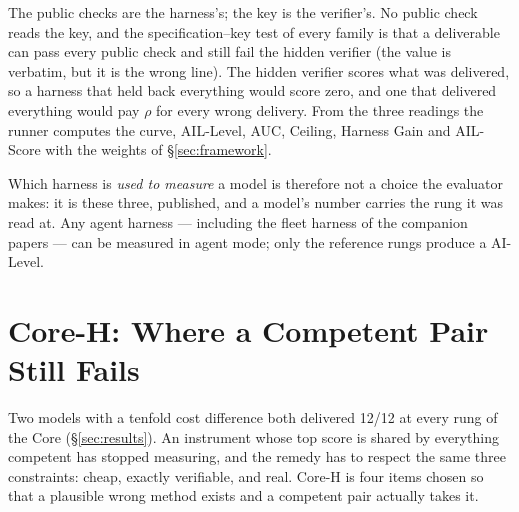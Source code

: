 \documentclass[11pt]{article}
\theoremstyle{definition}
\begin{document}
The public checks are the harness's; the key is the verifier's. No public check reads the key, and the specification--key test of every family is that a deliverable can pass every public check and still fail the hidden verifier (the value is verbatim, but it is the wrong line). The hidden verifier scores what was delivered, so a harness that held back everything would score zero, and one that delivered everything would pay $\rho$ for every wrong delivery. From the three readings the runner computes the curve, AIL-Level, AUC, Ceiling, Harness Gain and AIL-Score with the weights of \S\ref{sec:framework}.

Which harness is \emph{used to measure} a model is therefore not a choice the evaluator makes: it is these three, published, and a model's number carries the rung it was read at. Any agent harness --- including the fleet harness of the companion papers --- can be measured in agent mode; only the reference rungs produce a AI-Level.

\section{Core-H: Where a Competent Pair Still Fails}\label{sec:coreh}

Two models with a tenfold cost difference both delivered 12/12 at every rung of the Core (\S\ref{sec:results}). An instrument whose top score is shared by everything competent has stopped measuring, and the remedy has to respect the same three constraints: cheap, exactly verifiable, and real. Core-H is four items chosen so that a plausible wrong method exists and a competent pair actually takes it.
\end{document}
